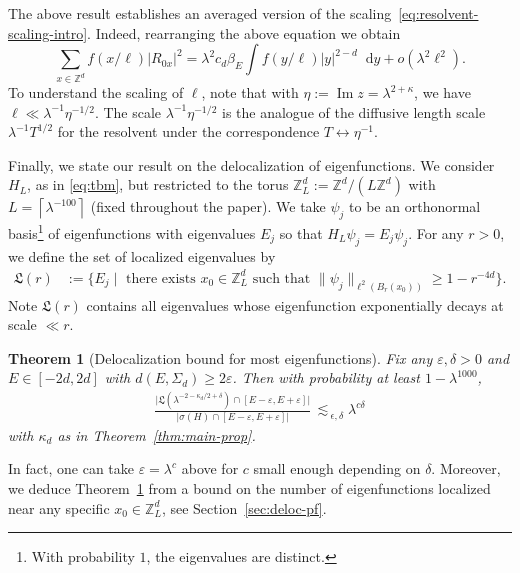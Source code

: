 \documentclass[11pt]{amsart}
\def\bbZ{{\mathbb Z}}
\def\eps{{\varepsilon}}
\newcommand{\diff}{\mathop{}\!\mathrm{d}}
\newcommand{\Impt}{\operatorname*{Im}}
\def\lsim{{\,\lesssim\,}}
\numberwithin{equation}{section}
\newtheorem{theorem}{Theorem}
\numberwithin{theorem}{section}
\begin{document}
The above result establishes an averaged version of the scaling~\eqref{eq:resolvent-scaling-intro}.  Indeed, rearranging the above equation we obtain
\[
\sum_{x\in\bbZ^d} f(x/\ell)|R_{0x}|^2
= \lambda^2 c_d\beta_E \int f(y/\ell) |y|^{2-d}\diff y
+ o(\lambda^2\ell^2).
\]
To understand the scaling of $\ell$, note that with $\eta := \Impt z = \lambda^{2+\kappa}$, we have
$\ell \ll \lambda^{-1}\eta^{-1/2}$.
The scale $\lambda^{-1}\eta^{-1/2}$ is the analogue of the diffusive length scale $\lambda^{-1}T^{1/2}$ for the resolvent under the correspondence $T \leftrightarrow \eta^{-1}$.

Finally, we state our result on the delocalization of eigenfunctions. We consider $H_L$, as in \eqref{eq:tbm},
but restricted to the torus $\bbZ^d_L := \bbZ^d/ (L\bbZ^d)$ with $L =\left\lceil\lambda^{-100}\right\rceil$ (fixed throughout the paper).  We take $\psi_j$ to be an orthonormal basis\footnote{With probability $1$, the eigenvalues are distinct.} of eigenfunctions with eigenvalues $E_j$ so that $H_L\psi_j = E_j\psi_j$.
For any $r>0$, we define the set of localized eigenvalues by
\begin{align*}
\mathfrak{L}(r) & :=
\{E_j \mid \text{ there exists } x_0\in\bbZ^d_L \text{ such that }
\|\psi_j\|_{\ell^2(B_r(x_0))} \geq 1 -r^{-4d}\}.
\end{align*}
Note $\mathfrak{L}(r)$ contains all eigenvalues whose eigenfunction  exponentially decays at scale $\ll r$.
\begin{theorem}[Delocalization bound for most eigenfunctions]
\label{thm:deloc}
Fix any $\eps,\delta>0$ and $E\in [-2d,2d]$ with $d(E,\Sigma_d)\geq 2\eps$.
Then with probability at least $1-\lambda^{1000}$,
\begin{align*}
\frac{\Big | \mathfrak{L}(\lambda^{-2-\kappa_d/2+\delta})\cap [E-\eps, E+\eps]\Big |}{\Big |\sigma(H)\cap [E-\eps, E+\eps]\Big|} \lsim_{\epsilon,\delta} \lambda^{c\delta}
\end{align*}
with $\kappa_d$ as in Theorem~\ref{thm:main-prop}.
\end{theorem}
In fact, one can take $\eps = \lambda^c$ above for $c$ small enough depending on $\delta$.  Moreover, we deduce Theorem~\ref{thm:deloc}
from a bound on the number of eigenfunctions localized near any specific $x_0\in\bbZ^d_L$, see Section~\ref{sec:deloc-pf}.
\end{document}
